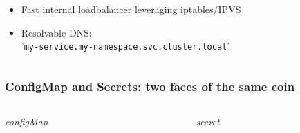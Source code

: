 \documentclass{beamer}
\begin{document}
\begin{frame}[fragile]
\begin{columns}
\begin{column}{0.6\textwidth}
{      \begin{itemize}
        \item<4-> Fast internal loadbalancer leveraging iptables/IPVS
        \item<5-> Resolvable DNS: \\
          \scriptsize{'\lstinline{my-service.my-namespace.svc.cluster.local}'}
      \end{itemize}

     }
  \end{column}
  \end{columns}

\end{frame}

\begin{frame}
    \frametitle{ConfigMap and Secrets: two faces of the same coin}
    \begin{columns}
    \begin{column}{0.3\textwidth}
        \textit{\scriptsize{configMap}}
      \inputminted[fontsize=\tiny,frame=single]{yaml}{resources/configmap.yaml}
    \end{column}
    \begin{column}{0.3\textwidth}
      \textit{\scriptsize{secret}}
      \inputminted[fontsize=\tiny,frame=single]{yaml}{resources/secret.yaml}
    \end{column}
    \end{columns}
    \vfill
    \begin{columns}
    \begin{column}{0.4\textwidth}
      \inputminted[fontsize=\tiny,frame=single]{yaml}{resources/env.yaml}
    \end{column}
    \begin{column}{0.3\textwidth}
      \inputminted[fontsize=\tiny,frame=single]{yaml}{resources/volume.yaml}
    \end{column}
    \end{columns}
    \begin{center}
    \end{center}
\end{frame}
\end{document}
